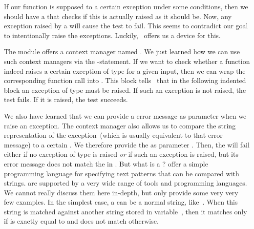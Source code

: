 If our function is supposed to  a certain exception under some conditions, then we should have a  that checks if this  is actually raised as it should be.
Now, any exception raised by a  will cause the test to fail.
This seems to contradict our goal to intentionally raise the exceptions.
Luckily, \pytest\ offers us a device for this.

The  module offers a context manager named .
We just learned how we can use such context managers via the -statement.
If we want to check whether a function indeed raises a certain exception of type  for a given input, then we can wrap the corresponding function call into .
This block tells \pytest\ that in the following indented block an exception of type  must be raised.
If such an exception is not raised, the test fails.
If it is raised, the test succeeds.

We also have learned that we can provide a error message as parameter when we raise an exception.
The  context manager also allows us to compare the string representation of the exception~(which is usually equivalent to that error message) to a certain .
We therefore provide the  as parameter .
Then, the  will fail either if no exception of type  is raised \emph{or} if such an exception is raised, but its error message does not match the  in .%
%
%
\FloatBarrier%
%
%
%
%
%
%
%
But what is a ?
 offer a simple programming language for specifying text patterns that can be compared with strings.
 are supported by a very wide range of tools and programming languages.
We cannot really discuss them here in-depth, but only provide some very very few examples.
In the simplest case, a  can be a normal string, like~.
When this string is matched against another string stored in variable~, then it matches only if  is exactly equal to  and does not match otherwise.

